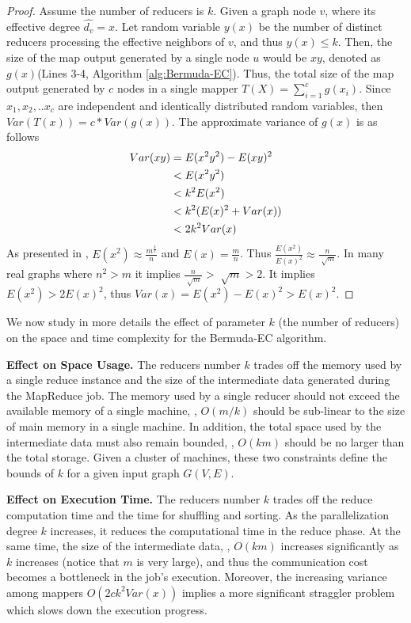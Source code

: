 \begin{proof}    
    Assume the number of reducers is $k$. Given a graph node $v$, where its effective degree $\hat{d_v}=x$. 
    Let random variable $y(x)$ be the number of distinct reducers processing the effective neighbors of $v$, and thus  $y(x) \leq k$. 
    Then, the size of the map output generated by a single node $u$ would be $xy$, denoted as $g(x)$(Lines 3-4, Algorithm \ref{alg:Bermuda-EC}). 
    Thus, the total size of the map output generated by $c$ nodes in a single mapper $T(X)=\sum_{i=1}^{c}g(x_i)$. 
    Since $x_1,x_2,..x_c$ are independent and identically distributed random variables, then $Var(T(x))=c*Var(g(x))$. 
    The approximate variance of $g(x)$ is as  follows 
    \vj
    \begin{align*}
    	Var(xy) &= E(x^2y^2)- E(xy)^2 \\
        		&< E(x^2y^2) \\
        	    &< k^2E(x^2) \\
           		&< k^2(E(x)^2+Var(x)) \\
               &< 2k^2Var(x) 
        \vspace{-4em}
    \end{align*}
As presented in \cite{Schank_2007}, $E(x^2) \approx \frac{m^{\frac{3}{2}}}{n}$ and $E(x)=\frac{m}{n}$. Thus $\frac{E(x^2)}{E(x)^2} \approx \frac{n}{\sqrt[]{m}} $. In many real graphs where $n^2 > m$ it implies $\frac{n} {\sqrt[]{m}} > \sqrt[]{m} >2$. It implies $E(x^2)> 2E(x)^2$, thus $Var(x)=E(x^2)-E(x)^2 > E(x)^2$.
\end{proof}

We now study in more details the effect of parameter $k$ (the number of reducers) on the space and time complexity for the Bermuda-EC algorithm.

\textbf{Effect on Space Usage.} The reducers number $k$ trades off the memory used by a single reduce instance and the size of the intermediate data generated during the MapReduce job. 
The memory used by a single reducer should not exceed the available memory of a single machine, {\ie}, $O(m/k)$ should be sub-linear to the size of main memory in a single machine. In addition, the total space used by the intermediate data must also remain bounded, {\ie}, $O(km)$ should be no larger than the total storage. 
Given a cluster of machines, these two constraints define the bounds of $k$ for a given 
input graph $G(V,E)$.  

\textbf{Effect on Execution Time.} The reducers number $k$ trades off the reduce computation time and the time for shuffling and sorting. 
As the parallelization degree $k$ increases, it reduces the computational time in the reduce phase. At the same time, the size of the intermediate data, {\ie}, $O(km)$ increases significantly as $k$ increases (notice that $m$ is very large), and
thus the communication cost becomes a bottleneck in the job's execution. 
Moreover, the increasing variance among mappers $O(2ck^2Var(x))$ implies a more significant straggler problem which slows down the execution progress. 


